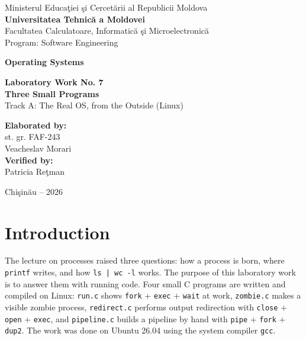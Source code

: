 \documentclass[12pt,a4paper]{article}
\begin{document}
\begin{titlepage}
    \centering
    Ministerul Educa\c{t}iei \c{s}i Cercet\u{a}rii al Republicii Moldova\\[0.4cm]
    \textbf{Universitatea Tehnic\u{a} a Moldovei}\\[0.4cm]
    Facultatea Calculatoare, Informatic\u{a} \c{s}i Microelectronic\u{a}\\[0.2cm]
    Program: Software Engineering

    \vspace{3cm}

    {\LARGE \textbf{Operating Systems}}

    \vspace{1.2cm}

    {\Large \textbf{Laboratory Work No. 7}}\\[0.6cm]
    {\LARGE \textbf{Three Small Programs}}\\[0.3cm]
    Track A: The Real OS, from the Outside (Linux)

    \vspace{3cm}

    \begin{flushright}
        \textbf{Elaborated by:}\\
        st. gr. FAF-243\\
        Veacheslav Morari\\[0.6cm]
        \textbf{Verified by:}\\
        Patricia Re\c{t}man
    \end{flushright}

    \vfill
    Chi\c{s}in\u{a}u -- 2026
\end{titlepage}

\tableofcontents
\newpage

\section*{Introduction}

The lecture on processes raised three questions: how a process is born, where \texttt{printf} writes, and how \texttt{ls | wc -l} works. The purpose of this laboratory work is to answer them with running code. Four small C programs are written and compiled on Linux: \texttt{run.c} shows \texttt{fork} + \texttt{exec} + \texttt{wait} at work, \texttt{zombie.c} makes a visible zombie process, \texttt{redirect.c} performs output redirection with \texttt{close} + \texttt{open} + \texttt{exec}, and \texttt{pipeline.c} builds a pipeline by hand with \texttt{pipe} + \texttt{fork} + \texttt{dup2}. The work was done on Ubuntu 26.04 using the system compiler \texttt{gcc}.
\end{document}
